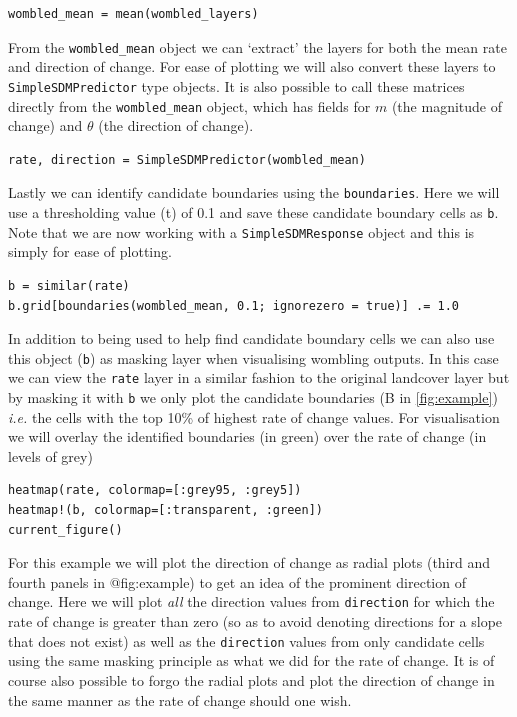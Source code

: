 \begin{verbatim}
wombled_mean = mean(wombled_layers)
\end{verbatim}

From the \texttt{wombled\_mean} object we can `extract' the layers for
both the mean rate and direction of change. For ease of plotting we will
also convert these layers to \texttt{SimpleSDMPredictor} type objects.
It is also possible to call these matrices directly from the
\texttt{wombled\_mean} object, which has fields for \(m\) (the magnitude
of change) and \(\theta\) (the direction of change).

\begin{verbatim}
rate, direction = SimpleSDMPredictor(wombled_mean)
\end{verbatim}

Lastly we can identify candidate boundaries using the
\texttt{boundaries}. Here we will use a thresholding value (t) of 0.1
and save these candidate boundary cells as \texttt{b}. Note that we are
now working with a \texttt{SimpleSDMResponse} object and this is simply
for ease of plotting.

\begin{verbatim}
b = similar(rate)
b.grid[boundaries(wombled_mean, 0.1; ignorezero = true)] .= 1.0
\end{verbatim}

In addition to being used to help find candidate boundary cells we can
also use this object (\texttt{b}) as masking layer when visualising
wombling outputs. In this case we can view the \texttt{rate} layer in a
similar fashion to the original landcover layer but by masking it with
\texttt{b} we only plot the candidate boundaries (B in \autoref{fig:example})
\emph{i.e.} the cells with the top 10\% of highest rate of change
values. For visualisation we will overlay the identified boundaries (in
green) over the rate of change (in levels of grey)

\begin{verbatim}
heatmap(rate, colormap=[:grey95, :grey5])
heatmap!(b, colormap=[:transparent, :green])
current_figure()
\end{verbatim}

For this example we will plot the direction of change as radial plots
(third and fourth panels in @fig:example) to get an idea of the
prominent direction of change. Here we will plot \emph{all} the
direction values from \texttt{direction} for which the rate of change is
greater than zero (so as to avoid denoting directions for a slope that
does not exist) as well as the \texttt{direction} values from only
candidate cells using the same masking principle as what we did for the
rate of change. It is of course also possible to forgo the radial plots
and plot the direction of change in the same manner as the rate of
change should one wish.

